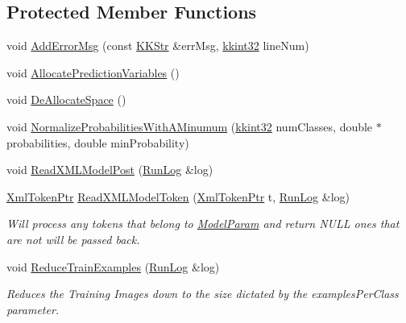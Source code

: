 \subsection*{Protected Member Functions}
\begin{DoxyCompactItemize}
\item 
void \hyperlink{class_k_k_m_l_l_1_1_model_adb50e734c8b33aff714bc2071b4800bb}{Add\+Error\+Msg} (const \hyperlink{class_k_k_b_1_1_k_k_str}{K\+K\+Str} \&err\+Msg, \hyperlink{namespace_k_k_b_a8fa4952cc84fda1de4bec1fbdd8d5b1b}{kkint32} line\+Num)
\item 
void \hyperlink{class_k_k_m_l_l_1_1_model_a05fa287ac763912f064ddfea474440f1}{Allocate\+Prediction\+Variables} ()
\item 
void \hyperlink{class_k_k_m_l_l_1_1_model_ad6d8fca60b56fdfdef689f2c0eda4b0e}{De\+Allocate\+Space} ()
\item 
void \hyperlink{class_k_k_m_l_l_1_1_model_a9eae982b20625c4b59bb38e9d00dfbc1}{Normalize\+Probabilities\+With\+A\+Minumum} (\hyperlink{namespace_k_k_b_a8fa4952cc84fda1de4bec1fbdd8d5b1b}{kkint32} num\+Classes, double $\ast$probabilities, double min\+Probability)
\item 
void \hyperlink{class_k_k_m_l_l_1_1_model_a8e5709f57258442f969f8c5164d4b755}{Read\+X\+M\+L\+Model\+Post} (\hyperlink{class_k_k_b_1_1_run_log}{Run\+Log} \&log)
\item 
\hyperlink{namespace_k_k_b_af349a060847626df6b468fe15d373972}{Xml\+Token\+Ptr} \hyperlink{class_k_k_m_l_l_1_1_model_a9feaeb8870d1f137b74586bb434b09d2}{Read\+X\+M\+L\+Model\+Token} (\hyperlink{namespace_k_k_b_af349a060847626df6b468fe15d373972}{Xml\+Token\+Ptr} t, \hyperlink{class_k_k_b_1_1_run_log}{Run\+Log} \&log)
\begin{DoxyCompactList}\small\item\em Will process any tokens that belong to \textquotesingle{}\hyperlink{class_k_k_m_l_l_1_1_model_param}{Model\+Param}\textquotesingle{} and return N\+U\+LL ones that are not will be passed back. \end{DoxyCompactList}\item 
void \hyperlink{class_k_k_m_l_l_1_1_model_acf6b88d14b996c75762537fa62253027}{Reduce\+Train\+Examples} (\hyperlink{class_k_k_b_1_1_run_log}{Run\+Log} \&log)
\begin{DoxyCompactList}\small\item\em Reduces the Training Images down to the size dictated by the \textquotesingle{}examples\+Per\+Class\textquotesingle{} parameter. \end{DoxyCompactList}\end{DoxyCompactItemize}
